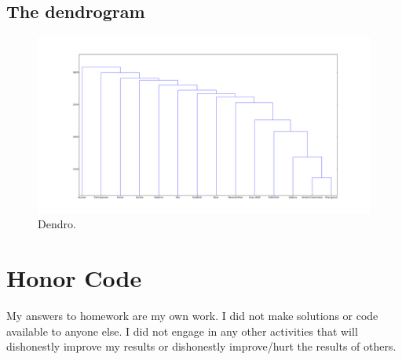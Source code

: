 \documentclass[a4paper,11pt]{article}
\begin{document}
\subsection{The dendrogram}

\begin{figure}[h!]
\begin{center}
\includegraphics[scale=0.25]{dendro1.png}
\caption{Dendro.}
\label{precrec}
\end{center}
\end{figure}

\section*{Honor Code}


My answers to homework are my own work. I did not make solutions or code available to anyone else. I did not engage in any other activities that will dishonestly improve my results or dishonestly improve/hurt the results of others.
\end{document}
